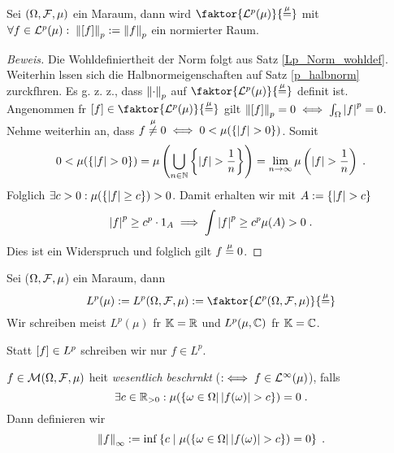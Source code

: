 \begin{theorem} Sei \((\Omega, \mathcal{F}, \mu)\) ein Ma\s raum, dann wird
	\(\faktor{\p^p(\mu)}{\muq}\) mit \(\forall f \in \mathcal{L}^p(\mu): \;\left\lVert\left[ f\right]\right\rVert_{p} := \left\lVert f\right\rVert_{p}\) ein normierter Raum.
\end{theorem}
\begin{proof}[Beweis]
	Die Wohldefiniertheit der Norm folgt aus Satz \ref{Lp_Norm_wohldef}. Weiterhin l\as ssen sich die Halbnormeigenschaften auf Satz \ref{p_halbnorm} zur\us ckf\us hren. Es g. z. z., dass \(\left\lVert\cdot\right\rVert_{p}\) auf \(\faktor{\p^p(\mu)}{\muq}\) definit ist. Angenommen f\us r \(\equ{f} \in \faktor{\p^p(\mu)}{\muq}\)  gilt \(\left\lVert\left[ f\right]\right\rVert_{p} = 0 \iff \int_\Omega \left\lvert f \right\rvert^p = 0\). Nehme weiterhin an, dass \(f \overset{\mu}{\neq} 0\iff 0< \mu(\left\{\left\lvert f \right\rvert>0\right\})\). Somit
	\[0<\mu(\left\{\left\lvert f \right\rvert>0\right\}) = \mu\left(\bigcup_{n\in\mathbb{N}}\left\{\left\lvert f \right\rvert > \frac{1}{n}\right\}\right) = \lim_{n \to\infty}\mu \left(\left\lvert f \right\rvert> \frac{1}{n}\right)\;.\]
	Folglich \(\exists c>0: \mu(\left\{\left\lvert f \right\rvert\geq c\right\}) > 0\). Damit erhalten wir mit \(A := \left\{\left\lvert f \right\rvert>c\right\}\)
	\[\left\lvert f \right\rvert^p \geq c^p \cdot 1_A \implies \int \left\lvert f \right\rvert^p \geq c^p \mu(A) > 0\;.\]
	Dies ist ein Widerspruch und folglich gilt \(f\overset{\mu}{=} 0\).
\end{proof}

\begin{definition}
	Sei (\(\Omega, \mathcal{F}, \mu\)) ein Ma\s raum, dann 
	\[L^p(\mu) := L^p(\Omega,\mc F, \mu) := \faktor{\p^p(\Omega, \mc F,\mu)}{\muq}\]
	Wir schreiben meist \(L^p(\mu)\) f\us r \(\mathbb{K} = \mathbb{R}\) und \(L^p(\mu, \mathbb{C})\) f\us r \(\mathbb{K} = \mathbb{C}\).
\end{definition}
 \begin{rem}
 	Statt \(\left[ f\right] \in L^p\) schreiben wir nur \(f\in L^p\).
 \end{rem}
\begin{definition}
	\(f\in \mathcal{M}(\Omega, \mathcal{F}, \mu)\) hei\s t \textit{wesentlich beschr\as nkt} (\(:\iff f \in \mathcal{L}^\infty(\mu)\)), falls
	\[\exists c \in \mathbb{R}_{>0} : \mu(\left\{\omega \in\Omega\vert \left\lvert f(\omega) \right\rvert > c\right\}) = 0\;.\]
	Dann definieren wir
	\[\left\lVert f\right\rVert_\infty := \inf\left\{c\;\vert\;\mu(\left\{\omega \in\Omega\vert \left\lvert f(\omega) \right\rvert > c\right\}) = 0\right\}\;.\]
\end{definition}

